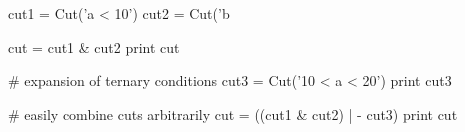 \begin{footnotesize}
\begin{pyglist}[language=python,texcl=true,abovecaptionskip=0,style=vs,bgcolor=Moccasin]

cut1 = Cut('a < 10')
cut2 = Cut('b %

cut = cut1 & cut2
print cut

# expansion of ternary conditions
cut3 = Cut('10 < a < 20')
print cut3

# easily combine cuts arbitrarily
cut = ((cut1 & cut2) | - cut3)
print cut
\end{pyglist}
\end{footnotesize}
